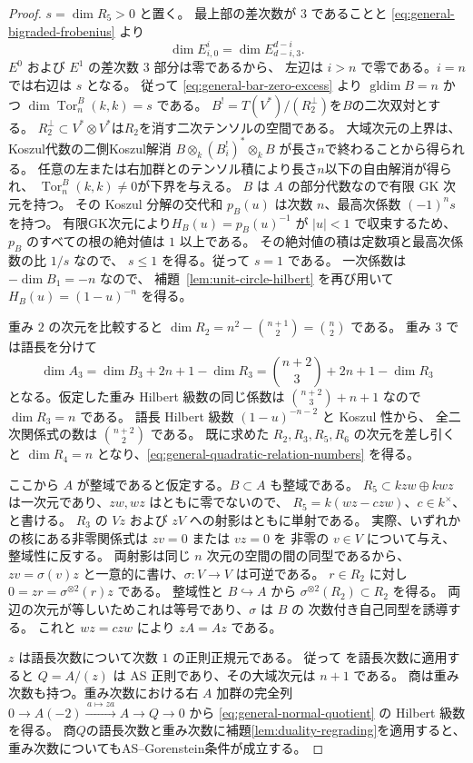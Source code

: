 \documentclass[11pt,a4paper]{ltjsarticle}
\theoremstyle{definition}
\newcommand{\Tor}{\operatorname{Tor}}
\begin{document}
\begin{proof}
$s=\dim R_5>0$ と置く。
最上部の差次数が $3$ であることと
\eqref{eq:general-bigraded-frobenius} より
\[
 \dim E^i_{i,0}=\dim E^{d-i}_{d-i,3}.
\]
$E^0$ および $E^1$ の差次数 $3$ 部分は零であるから、
左辺は $i>n$ で零である。$i=n$ では右辺は $s$ となる。
従って \eqref{eq:general-bar-zero-excess} より
$\operatorname{gldim}B=n$ かつ
$\dim\operatorname{Tor}^B_n(k,k)=s$ である。
$B^!=T(V^*)/(R_2^\perp)$を$B$の二次双対とする。
$R_2^\perp\subset V^*\otimes V^*$は$R_2$を消す二次テンソルの空間である。
大域次元の上界は、Koszul代数の二側Koszul解消
$B\otimes_k(B_i^!)^*\otimes_k B$ が長さ$n$で終わることから得られる。
任意の左または右加群とのテンソル積により長さ$n$以下の自由解消が得られ、
$\Tor^B_n(k,k)\ne0$が下界を与える。
$B$ は $A$ の部分代数なので有限 GK 次元を持つ。
その Koszul 分解の交代和 $p_B(u)$ は次数 $n$、最高次係数 $(-1)^ns$ を持つ。
有限GK次元により$H_B(u)=p_B(u)^{-1}$ が $|u|<1$ で収束するため、
$p_B$ のすべての根の絶対値は $1$ 以上である。
その絶対値の積は定数項と最高次係数の比 $1/s$ なので、
$s\leq1$ を得る。従って $s=1$ である。
一次係数は $-\dim B_1=-n$ なので、
補題~\ref{lem:unit-circle-hilbert} を再び用いて
$H_B(u)=(1-u)^{-n}$ を得る。

重み $2$ の次元を比較すると
$\dim R_2=n^2-\binom{n+1}{2}=\binom n2$ である。
重み $3$ では語長を分けて
\[
 \dim A_3=\dim B_3+2n+1-\dim R_3
          =\binom{n+2}{3}+2n+1-\dim R_3
\]
となる。仮定した重み Hilbert 級数の同じ係数は
$\binom{n+2}{3}+n+1$ なので $\dim R_3=n$ である。
語長 Hilbert 級数 $(1-u)^{-n-2}$ と Koszul 性から、
全二次関係式の数は $\binom{n+2}{2}$ である。
既に求めた $R_2,R_3,R_5,R_6$ の次元を差し引くと
$\dim R_4=n$ となり、\eqref{eq:general-quadratic-relation-numbers} を得る。

ここから $A$ が整域であると仮定する。$B\subset A$ も整域である。
$R_5\subset kzw\oplus kwz$ は一次元であり、$zw,wz$ はともに零でないので、
$R_5=k(wz-czw)$、$c\in k^\times$、と書ける。
$R_3$ の $Vz$ および $zV$ への射影はともに単射である。
実際、いずれかの核にある非零関係式は $zv=0$ または $vz=0$ を
非零の $v\in V$ について与え、整域性に反する。
両射影は同じ $n$ 次元の空間の間の同型であるから、
$zv=\sigma(v)z$ と一意的に書け、$\sigma:V\to V$ は可逆である。
$r\in R_2$ に対し
$0=zr=\sigma^{\otimes2}(r)z$ である。
整域性と $B\hookrightarrow A$ から
$\sigma^{\otimes2}(R_2)\subset R_2$ を得る。
両辺の次元が等しいためこれは等号であり、$\sigma$ は $B$ の
次数付き自己同型を誘導する。
これと $wz=c zw$ により $zA=Az$ である。

$z$ は語長次数について次数 $1$ の正則正規元である。
従って \cite[Lemma~1.1, Corollary~1.2]{RZ} を語長次数に適用すると
$Q=A/(z)$ は AS 正則であり、その大域次元は $n+1$ である。
商は重み次数も持つ。重み次数における右 $A$ 加群の完全列
$0\to A(-2)\xrightarrow{\,a\mapsto za\,}A\to Q\to0$
から \eqref{eq:general-normal-quotient} の Hilbert 級数を得る。
商$Q$の語長次数と重み次数に補題\ref{lem:duality-regrading}を適用すると、
重み次数についてもAS--Gorenstein条件が成立する。
\end{proof}
\end{document}
